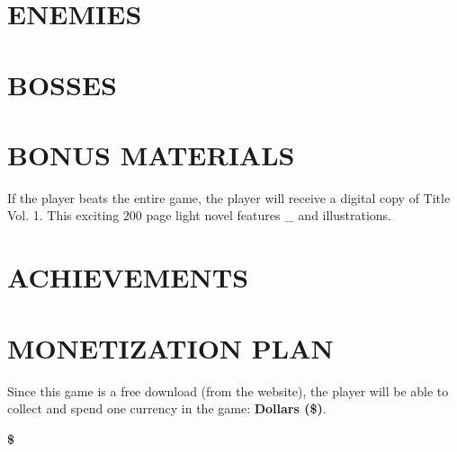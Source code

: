 \documentclass[11pt]{article}
\begin{document}
	\section*{ENEMIES}
	
	\section*{BOSSES}
	
	\begin{description}[align=right,labelwidth=3cm,noitemsep]
		\item [] \label{MechaSally}
		\item [] \label{MechaSally}
		\item [] \label{MechaSally}
		\item [] \label{MechaSally}
		\item [] \label{MechaSally}
		\item [] \label{MechaSally}
		\item [] \label{MechaSally}
		\item [] \label{MechaSally}
		\item [] \label{MechaSally}
	\end{description}
	\newpage
	\section*{BONUS MATERIALS} \label{BonusMaterials}
	If the player beats the entire game, the player will receive a digital copy of Title Vol. 1. This exciting 200 page light novel features \_ and illustrations.
	\section*{ACHIEVEMENTS} \label{Achievements}
	\begin{description}[align=right,labelwidth=3cm]
		\item [Money Saver] 
		\item [Man of Tesla] 
		\item [] 
		\item [] 
		\item [] 
		\item [] 
		\item [] 
		\item [] 
	\end{description}	
	\newpage
	\section*{MONETIZATION PLAN}
	Since this game is a free download (from the website), the player will be able to collect and spend one currency in the game: \textbf{Dollars (\$)}. %
	\begin{center}
		\textbf{\Huge \$}
	\end{center}
\end{document}

